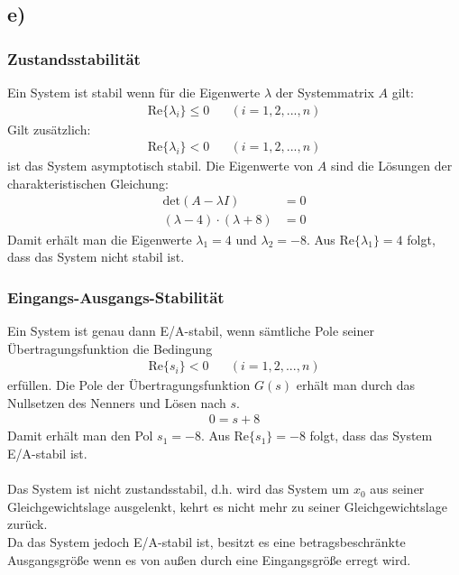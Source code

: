 \documentclass[11pt]{scrartcl} %
\begin{document}
\subsection*{e)}
\subsubsection*{Zustandsstabilität}
Ein System ist stabil wenn für die Eigenwerte $\lambda$ der Systemmatrix $A$ gilt:
\begin{align*}
	\text{Re}\{\lambda_i\}\leq0\hspace{20pt}(i=1,2,...,n)
\end{align*}
Gilt zusätzlich:
\begin{align*}
	\text{Re}\{\lambda_i\}<0\hspace{20pt}(i=1,2,...,n)
\end{align*}
ist das System asymptotisch stabil.
Die Eigenwerte von $A$ sind die Lösungen der charakteristischen Gleichung:
\begin{align*}
	\text{det}(A-\lambda I)&=0\\
	(\lambda-4)\cdot(\lambda+8)&=0
\end{align*}
Damit erhält man die Eigenwerte $\lambda_1=4$ und $\lambda_2=-8$. Aus $\text{Re}\{\lambda_{1}\}=4$ folgt, dass das System nicht stabil ist.
\subsubsection*{Eingangs-Ausgangs-Stabilität}
Ein System ist genau dann E/A-stabil, wenn sämtliche Pole seiner Übertragungsfunktion die Bedingung 
\begin{align*}
	\text{Re}\{s_i\}<0\hspace{20pt}(i=1,2,...,n)
\end{align*}
erfüllen.
Die Pole der Übertragungsfunktion $G(s)$ erhält man durch das Nullsetzen des Nenners und Lösen nach $s$.
\begin{align*}
	0=s+8
\end{align*}
Damit erhält man den Pol $s_1=-8$. Aus $\text{Re}\{s_{1}\}=-8$
folgt, dass das System E/A-stabil ist.\\\\
Das System ist nicht zustandsstabil, d.h. wird das System um $x_0$ aus seiner Gleichgewichtslage ausgelenkt, kehrt es nicht mehr zu seiner Gleichgewichtslage zurück.\\
Da das System jedoch E/A-stabil ist, besitzt es eine betragsbeschränkte Ausgangsgröße wenn es von außen durch eine Eingangsgröße erregt wird.
\end{document}
